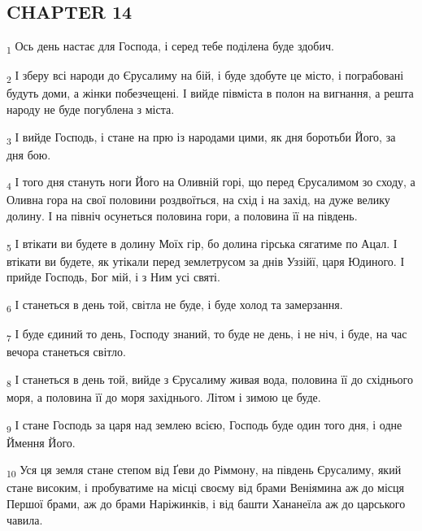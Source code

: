 \subsection{CHAPTER 14}
\begin{tcolorbox}
\textsubscript{1} Ось день настає для Господа, і серед тебе поділена буде здобич.
\end{tcolorbox}
\begin{tcolorbox}
\textsubscript{2} І зберу всі народи до Єрусалиму на бій, і буде здобуте це місто, і пограбовані будуть доми, а жінки побезчещені. І вийде півміста в полон на вигнання, а решта народу не буде погублена з міста.
\end{tcolorbox}
\begin{tcolorbox}
\textsubscript{3} І вийде Господь, і стане на прю із народами цими, як дня боротьби Його, за дня бою.
\end{tcolorbox}
\begin{tcolorbox}
\textsubscript{4} І того дня стануть ноги Його на Оливній горі, що перед Єрусалимом зо сходу, а Оливна гора на свої половини роздвоїться, на схід і на захід, на дуже велику долину. І на північ осунеться половина гори, а половина її на південь.
\end{tcolorbox}
\begin{tcolorbox}
\textsubscript{5} І втікати ви будете в долину Моїх гір, бо долина гірська сягатиме по Ацал. І втікати ви будете, як утікали перед землетрусом за днів Уззійї, царя Юдиного. І прийде Господь, Бог мій, і з Ним усі святі.
\end{tcolorbox}
\begin{tcolorbox}
\textsubscript{6} І станеться в день той, світла не буде, і буде холод та замерзання.
\end{tcolorbox}
\begin{tcolorbox}
\textsubscript{7} І буде єдиний то день, Господу знаний, то буде не день, і не ніч, і буде, на час вечора станеться світло.
\end{tcolorbox}
\begin{tcolorbox}
\textsubscript{8} І станеться в день той, вийде з Єрусалиму живая вода, половина її до східнього моря, а половина її до моря західнього. Літом і зимою це буде.
\end{tcolorbox}
\begin{tcolorbox}
\textsubscript{9} І стане Господь за царя над землею всією, Господь буде один того дня, і одне Ймення Його.
\end{tcolorbox}
\begin{tcolorbox}
\textsubscript{10} Уся ця земля стане степом від Ґеви до Ріммону, на південь Єрусалиму, який стане високим, і пробуватиме на місці своєму від брами Веніямина аж до місця Першої брами, аж до брами Наріжинків, і від башти Хананеїла аж до царського чавила.
\end{tcolorbox}
